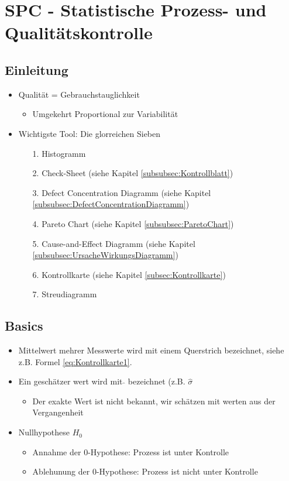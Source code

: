 \section{SPC - Statistische Prozess- und Qualitätskontrolle}

\subsection{Einleitung}
\begin{itemize}
	\item Qualität = Gebrauchstauglichkeit
	\begin{itemize}
		\item Umgekehrt Proportional zur Variabilität
	\end{itemize}
	\item Wichtigste Tool: Die glorreichen Sieben
	\begin{itemize}
		\item[1.] Histogramm
		\item[2.] Check-Sheet (siehe Kapitel \ref{subsubsec:Kontrollblatt})
		\item[3.] Defect Concentration Diagramm (siehe Kapitel \ref{subsubsec:DefectConcentrationDiagramm})
		\item[4.] Pareto Chart (siehe Kapitel \ref{subsubsec:ParetoChart})
		\item[5.] Cause-and-Effect Diagramm (siehe Kapitel \ref{subsubsec:UrsacheWirkungsDiagramm})
		\item[6.] Kontrollkarte (siehe Kapitel \ref{subsec:Kontrollkarte})
		\item[7.] Streudiagramm
	\end{itemize}
\end{itemize}

\subsection{Basics}
\begin{itemize}
	\item Mittelwert mehrer Messwerte wird mit einem Querstrich bezeichnet, siehe z.B. Formel \ref{eq:Kontrollkarte1}.
	\item Ein geschätzer wert wird mit $\hat{ }$ bezeichnet (z.B. $\hat{\sigma}$
	\begin{itemize}
		\item Der exakte Wert ist nicht bekannt, wir schätzen mit werten aus der Vergangenheit
	\end{itemize}
	\item Nullhypothese $H_0$
	\begin{itemize}
		\item Annahme der 0-Hypothese: Prozess ist unter Kontrolle
		\item Ablehunung der 0-Hypothese: Prozess ist nicht unter Kontrolle
	\end{itemize}
\end{itemize}


